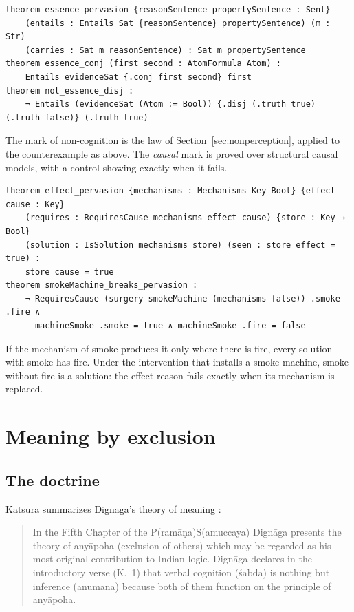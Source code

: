 \documentclass[11pt]{article}
\theoremstyle{plain}
\theoremstyle{definition}
\begin{document}
\begin{lstlisting}
theorem essence_pervasion {reasonSentence propertySentence : Sent}
    (entails : Entails Sat {reasonSentence} propertySentence) (m : Str)
    (carries : Sat m reasonSentence) : Sat m propertySentence
theorem essence_conj (first second : AtomFormula Atom) :
    Entails evidenceSat {.conj first second} first
theorem not_essence_disj :
    ¬ Entails (evidenceSat (Atom := Bool)) {.disj (.truth true) (.truth false)} (.truth true)
\end{lstlisting}

\noindent The mark of non-cognition is the law of Section~\ref{sec:nonperception}, applied to
the counterexample as above. The \emph{causal} mark is proved over structural causal models,
with a control showing exactly when it fails.

\begin{lstlisting}
theorem effect_pervasion {mechanisms : Mechanisms Key Bool} {effect cause : Key}
    (requires : RequiresCause mechanisms effect cause) {store : Key → Bool}
    (solution : IsSolution mechanisms store) (seen : store effect = true) :
    store cause = true
theorem smokeMachine_breaks_pervasion :
    ¬ RequiresCause (surgery smokeMachine (mechanisms false)) .smoke .fire ∧
      machineSmoke .smoke = true ∧ machineSmoke .fire = false
\end{lstlisting}

\noindent If the mechanism of smoke produces it only where there is fire, every solution with
smoke has fire. Under the intervention that installs a smoke machine, smoke without fire is a
solution: the effect reason fails exactly when its mechanism is replaced.

\section{Meaning by exclusion}
\label{sec:apoha}

\subsection{The doctrine}

Katsura summarizes Dignāga's theory of meaning \cite{Katsura1979}:

\begin{quote}
In the Fifth Chapter of the P(ramāṇa)S(amuccaya) Dignāga presents the theory of anyāpoha
(exclusion of others) which may be regarded as his most original contribution to Indian
logic. Dignāga declares in the introductory verse (K.~1) that verbal cognition (śabda) is
nothing but inference (anumāna) because both of them function on the principle of
anyāpoha.
\end{quote}
\end{document}
